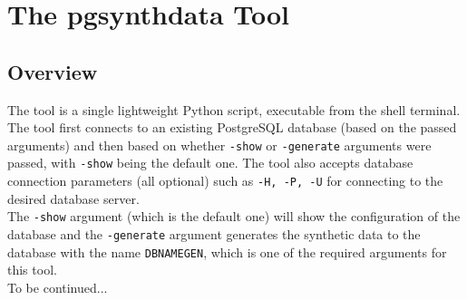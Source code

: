 \chapter{The pgsynthdata Tool}
\label{ch:pgsynthdata_tool}
\section{Overview}
The tool is a single lightweight Python script, executable from the shell terminal. The tool first connects to an existing PostgreSQL database (based on the passed arguments) and then based on whether \texttt{-show} or \texttt{-generate} arguments were passed, with \texttt{-show} being the default one. The tool also accepts database connection parameters (all optional) such as \texttt{-H, -P, -U} for connecting to the desired database server.\\
The \texttt{-show} argument (which is the default one) will show the configuration of the database and the \texttt{-generate} argument generates the synthetic data to the database with the name \texttt{DBNAMEGEN}, which is one of the required arguments for this tool.\\
To be continued...
